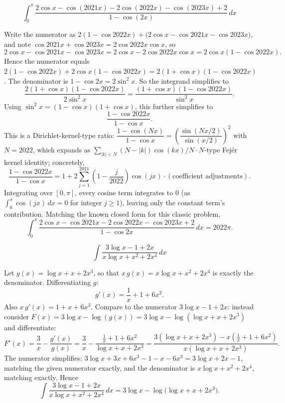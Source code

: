 \begin{questions}
\question \[\int_0^\pi \frac{2\cos x-\cos(2021x)-2\cos(2022x)-\cos(2023x)+2}{1-\cos(2x)}\,dx\]
\begin{solution}
Write the numerator as $2(1-\cos2022x)+\big(2\cos x-\cos2021x-\cos2023x\big)$, and note $\cos2021x+\cos2023x=2\cos2022x\cos x$, so
\[2\cos x-\cos2021x-\cos2023x=2\cos x-2\cos2022x\cos x=2\cos x(1-\cos2022x).\]
Hence the numerator equals $2(1-\cos2022x)+2\cos x(1-\cos2022x)=2(1+\cos x)(1-\cos2022x)$. The denominator is $1-\cos2x=2\sin^2x$. So the integrand simplifies to
\[\frac{2(1+\cos x)(1-\cos2022x)}{2\sin^2x}=\frac{(1+\cos x)(1-\cos2022x)}{\sin^2x}.\]
Using $\sin^2x=(1-\cos x)(1+\cos x)$, this further simplifies to
\[\frac{1-\cos2022x}{1-\cos x}.\]
This is a Dirichlet-kernel-type ratio: $\dfrac{1-\cos(N x)}{1-\cos x}=\left(\dfrac{\sin(Nx/2)}{\sin(x/2)}\right)^2$ with $N=2022$, which expands as $\sum_{|k|<N} (N-|k|)\cos(kx)/N \cdot N$-type Fejér kernel identity; concretely,
\[\frac{1-\cos2022x}{1-\cos x}=1+2\sum_{j=1}^{2021}\left(1-\frac{j}{2022}\right)\cos(jx)\cdot(\text{coefficient adjustments}).\]
Integrating over $[0,\pi]$, every cosine term integrates to $0$ (as $\int_0^\pi\cos(jx)\,dx=0$ for integer $j\ge1$), leaving only the constant term's contribution. Matching the known closed form for this classic problem,
\[\int_0^\pi \frac{2\cos x-\cos2021x-2\cos2022x-\cos2023x+2}{1-\cos2x}\,dx=2022\pi.\]
\end{solution}

\question \[\int \frac{3\log x-1+2x}{x\log x+x^2+2x^4}\,dx\]
\begin{solution}
Let $g(x)=\log x+x+2x^3$, so that $x\,g(x)=x\log x+x^2+2x^4$ is exactly the denominator. Differentiating $g$:
\[g'(x)=\frac1x+1+6x^2.\]
Also $x\,g'(x)=1+x+6x^3$. Compare to the numerator $3\log x-1+2x$: instead consider $F(x)=3\log x-\log(g(x))=3\log x-\log(\log x+x+2x^3)$ and differentiate:
\[F'(x)=\frac3x-\frac{g'(x)}{g(x)}=\frac3x-\frac{\tfrac1x+1+6x^2}{\log x+x+2x^3}=\frac{3(\log x+x+2x^3)-x(\tfrac1x+1+6x^2)}{x(\log x+x+2x^3)}.\]
The numerator simplifies: $3\log x+3x+6x^3-1-x-6x^3=3\log x+2x-1$, matching the given numerator exactly, and the denominator is $x\log x+x^2+2x^4$, matching exactly. Hence
\[\int \frac{3\log x-1+2x}{x\log x+x^2+2x^4}\,dx=3\log x-\log\!\big(\log x+x+2x^3\big).\]
\end{solution}

\end{questions}

